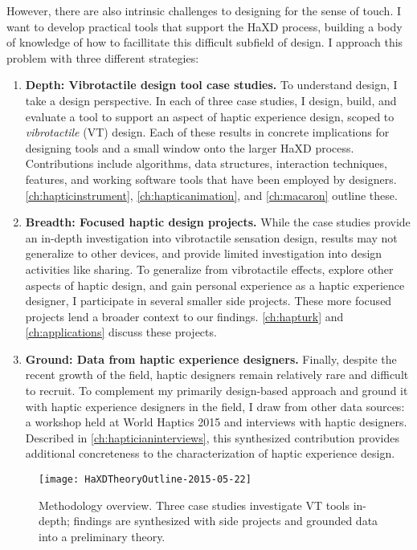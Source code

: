 However, there are also intrinsic challenges to designing for the sense of touch.
I want to develop practical tools that support the HaXD process, building a body of knowledge of how to facillitate this difficult subfield of design.
I approach this problem with three different strategies:
\begin{enumerate}
\item \textbf{Depth: Vibrotactile design tool case studies.}
To understand design, I take a design perspective.
In each of three case studies, I design, build, and evaluate a tool to support an aspect of haptic experience design, scoped to \emph{vibrotactile} (VT) design.
Each of these results in concrete implications for designing tools and a small window onto the larger HaXD process.
Contributions include algorithms, data structures, interaction techniques, features, and working software tools that have been employed by designers.
\autoref{ch:hapticinstrument}, \autoref{ch:hapticanimation}, and \autoref{ch:macaron} outline these.

\item \textbf{Breadth: Focused haptic design projects.}
While the case studies provide an in-depth investigation into vibrotactile sensation design, results may not generalize to other devices, and provide limited investigation into design activities like sharing.
To generalize from vibrotactile effects, explore other aspects of haptic design, and gain personal experience as a haptic experience designer, I participate in several smaller side projects.
These more focused projects lend a broader context to our findings.
\autoref{ch:hapturk} and \autoref{ch:applications} discuss these projects.

\item \textbf{Ground: Data from haptic experience designers.}
Finally, despite the recent growth of the field, haptic designers remain relatively rare and difficult to recruit.
To complement my primarily design-based approach and ground it with haptic experience designers in the field, I draw from other data sources: a workshop held at World Haptics 2015 and interviews with haptic designers.
Described in \autoref{ch:hapticianinterviews}, this synthesized contribution provides additional concreteness to the characterization of haptic experience design.
\end{enumerate}


\begin{figure}[htbp]
\begin{center}
\texttt{[image: HaXDTheoryOutline-2015-05-22]}
\caption{Methodology overview. Three case studies investigate VT tools in-depth; findings are synthesized with side projects and grounded data into a preliminary theory.}
\label{fig:intro:methodologyoverview}
\end{center}
\end{figure}


